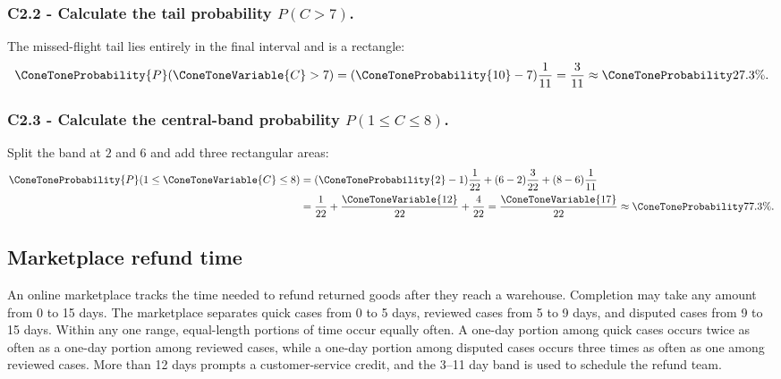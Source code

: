 \subsubsection*{C2.2 - Calculate the tail probability $P(C>7)$.}
\label{subsec:c2-piecewise-uniform-cargo-b}
The missed-flight tail lies entirely in the final interval and is a rectangle:
\[
 \ConeToneProbability{P}(\ConeToneVariable{C}>7)=(\ConeToneProbability{10}-7)\frac1{11}=\frac3{11}\approx\ConeToneProbability{27.3\%}.
\]

\subsubsection*{C2.3 - Calculate the central-band probability
$P(1\le C\le8)$.}
\label{subsec:c2-piecewise-uniform-cargo-c}
Split the band at $2$ and $6$ and add three rectangular areas:
\[
 \begin{aligned}
 \ConeToneProbability{P}(1\le \ConeToneVariable{C}\le8)
 &=(\ConeToneProbability{2}-1)\frac1{22}+(6-2)\frac3{22}+(8-6)\frac1{11}\\
 &=\frac1{22}+\frac{\ConeToneVariable{12}}{22}+\frac4{22}=\frac{\ConeToneVariable{17}}{22}\approx\ConeToneProbability{77.3\%}.
 \end{aligned}
\]

\subsection{Marketplace refund time}\label{sec:c2-piecewise-uniform-refund}
An online marketplace tracks the time needed to refund returned goods after
they reach a warehouse.  Completion may take any amount from 0 to 15 days.
The marketplace separates quick cases from 0 to 5 days, reviewed cases from 5
to 9 days, and disputed cases from 9 to 15 days.  Within any one range,
equal-length portions of time occur equally often.  A one-day portion among
quick cases occurs twice as often as a one-day portion among reviewed cases,
while a one-day portion among disputed cases occurs three times as often as one
among reviewed cases.  More than 12 days prompts a customer-service credit, and
the 3--11 day band is used to schedule the refund team.

\begingroup{}
\endgroup

